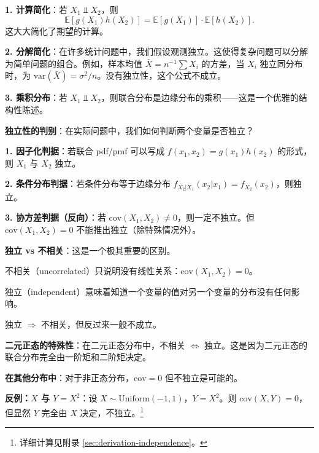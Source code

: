 \textbf{1. 计算简化}：若 $X_1 \Perp X_2$，则
\[
\mathbb{E}[g(X_1)h(X_2)] = \mathbb{E}[g(X_1)] \cdot \mathbb{E}[h(X_2)].
\]
这大大简化了期望的计算。

\textbf{2. 分解简化}：在许多统计问题中，我们假设观测独立。这使得复杂问题可以分解为简单问题的组合。例如，样本均值 $\bar{X} = n^{-1}\sum X_i$ 的方差，当 $X_i$ 独立同分布时，为 $\text{var}(\bar{X}) = \sigma^2/n$。没有独立性，这个公式不成立。

\textbf{3. 乘积分布}：若 $X_1 \Perp X_2$，则联合分布是边缘分布的乘积——这是一个优雅的结构性陈述。

\textbf{独立性的判别}：在实际问题中，我们如何判断两个变量是否独立？

\textbf{1. 因子化判据}：若联合 pdf/pmf 可以写成 $f(x_1, x_2) = g(x_1)h(x_2)$ 的形式，则 $X_1$ 与 $X_2$ 独立。

\textbf{2. 条件分布判据}：若条件分布等于边缘分布 $f_{X_2|X_1}(x_2|x_1) = f_{X_2}(x_2)$，则独立。

\textbf{3. 协方差判据（反向）}：若 $\text{cov}(X_1, X_2) \neq 0$，则一定不独立。但 $\text{cov}(X_1, X_2) = 0$ 不能推出独立（除特殊情况外）。

\textbf{独立 vs 不相关}：这是一个极其重要的区别。

不相关（uncorrelated）只说明没有线性关系：$\text{cov}(X_1, X_2) = 0$。

独立（independent）意味着知道一个变量的值对另一个变量的分布没有任何影响。

独立 $\Rightarrow$ 不相关，但反过来一般不成立。

\textbf{二元正态的特殊性}：在二元正态分布中，不相关 $\iff$ 独立。这是因为二元正态的联合分布完全由一阶矩和二阶矩决定。

\textbf{在其他分布中}：对于非正态分布，$\text{cov} = 0$ 但不独立是可能的。

\textbf{反例：$X$ 与 $Y = X^2$}：设 $X \sim \text{Uniform}(-1, 1)$，$Y = X^2$。则 $\text{cov}(X, Y) = 0$，但显然 $Y$ 完全由 $X$ 决定，不独立。\footnote{详细计算见附录 \cref{sec:derivation-independence}。}

